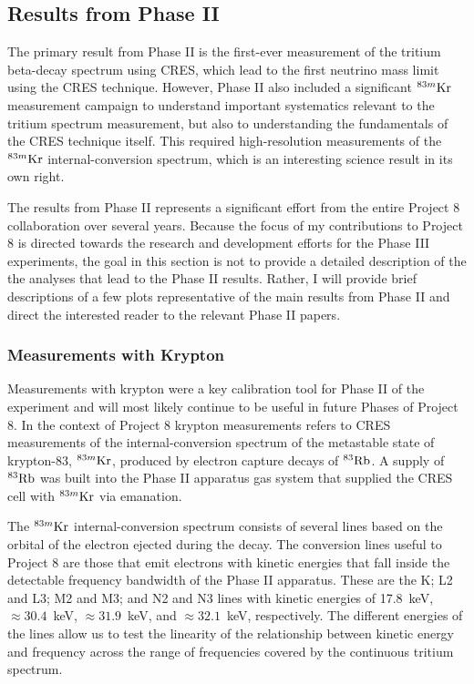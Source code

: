 \subsection{Results from Phase II}

The primary result from Phase II is the first-ever measurement of the tritium beta-decay spectrum using CRES, which lead to the first neutrino mass limit using the CRES technique. However, Phase II also included a significant $^{83m}\rm{Kr}$ measurement campaign to understand important systematics relevant to the tritium spectrum measurement, but also to understanding the fundamentals of the CRES technique itself. This required high-resolution measurements of the $^{83m}\rm{Kr}$ internal-conversion spectrum, which is an interesting science result in its own right.

The results from Phase II represents a significant effort from the entire Project 8 collaboration over several years. Because the focus of my contributions to Project 8 is directed towards the research and development efforts for the Phase III experiments, the goal in this section is not to provide a detailed description of the the analyses that lead to the Phase II results. Rather, I will provide brief descriptions of a few plots representative of the main results from Phase II and direct the interested reader to the relevant Phase II papers.  

\subsubsection*{Measurements with Krypton}

Measurements with krypton were a key calibration tool for Phase II of the experiment and will most likely continue to be useful in future Phases of Project 8. In the context of Project 8 krypton measurements refers to CRES measurements of the internal-conversion spectrum of the metastable state of krypton-83, $^{83m}\rm{Kr}$, produced by electron capture decays of $^{83}\rm{Rb}$. A supply of $^{83}\rm{Rb}$ was built into the Phase II apparatus gas system that supplied the CRES cell with $^{83m}\rm{Kr}$ via emanation.

The $^{83m}\rm{Kr}$ internal-conversion spectrum consists of several lines based on the orbital of the electron ejected during the decay. The conversion lines useful to Project 8 are those that emit electrons with kinetic energies that fall inside the detectable frequency bandwidth of the Phase II apparatus. These are the K; L2 and L3; M2 and M3; and N2 and N3 lines with kinetic energies of 17.8~keV, $\approx 30.4$~keV, $\approx 31.9$~keV, and $\approx 32.1$~keV, respectively. The different energies of the lines allow us to test the linearity of the relationship between kinetic energy and frequency across the range of frequencies covered by the continuous tritium spectrum.

